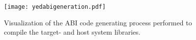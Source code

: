 
\begin{figure}
\centering

\texttt{[image: yedabigeneration.pdf]}

\caption[The ABI code generation process]{Visualization of the ABI code generating process performed to compile the target- and host system libraries.}
\label{fig:abigeneration}

\end{figure}
